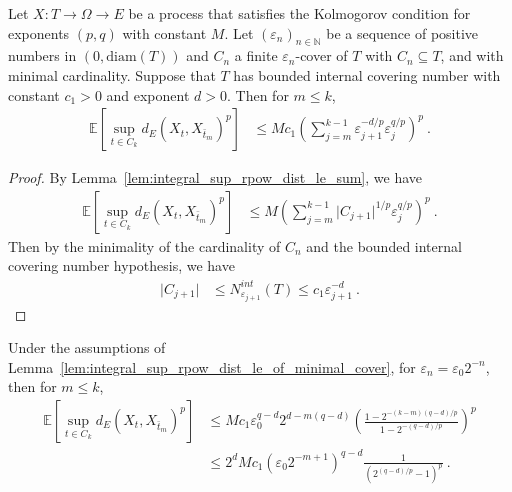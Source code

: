 \begin{lemma}\label{lem:integral_sup_rpow_dist_le_of_minimal_cover}
  \leanok
Let $X : T \to \Omega \to E$ be a process that satisfies the Kolmogorov condition for exponents $(p,q)$ with constant $M$.
Let $(\varepsilon_n)_{n \in \mathbb{N}}$ be a sequence of positive numbers in $(0, \mathrm{diam}(T))$ and $C_n$ a finite $\varepsilon_n$-cover of $T$ with $C_n \subseteq T$, and with minimal cardinality.
Suppose that $T$ has bounded internal covering number with constant $c_1>0$ and exponent $d > 0$.
Then for $m \le k$,
\begin{align*}
  \mathbb{E} \left[\sup_{t \in C_k} d_E(X_t, X_{\bar{t}_m})^p \right]
  &\le M c_1 \left( \sum_{j=m}^{k-1} \varepsilon_{j+1}^{-d/p} \varepsilon_j^{q/p} \right)^p
  \: .
\end{align*}
\end{lemma}

\begin{proof}
By Lemma~\ref{lem:integral_sup_rpow_dist_le_sum}, we have
\begin{align*}
  \mathbb{E} \left[\sup_{t \in C_k} d_E(X_t, X_{\bar{t}_m})^p \right]
  &\le M \left( \sum_{j=m}^{k-1} \vert C_{j+1} \vert^{1/p} \varepsilon_j^{q/p} \right)^p
  \: .
\end{align*}
Then by the minimality of the cardinality of $C_n$ and the bounded internal covering number hypothesis, we have
\begin{align*}
  \vert C_{j+1} \vert
  &\le N^{int}_{\varepsilon_{j+1}}(T)
  \le c_1 \varepsilon_{j+1}^{-d}
  \: .
\end{align*}
\end{proof}


\begin{corollary}\label{cor:integral_sup_rpow_dist_le_of_minimal_cover_two}
  \leanok
Under the assumptions of Lemma~\ref{lem:integral_sup_rpow_dist_le_of_minimal_cover}, for $\varepsilon_n = \varepsilon_0 2^{-n}$, then for $m \le k$,
\begin{align*}
  \mathbb{E} \left[\sup_{t \in C_k} d_E(X_t, X_{\bar{t}_m})^p \right]
  &\le M c_1 \varepsilon_0^{q - d} 2^{d - m(q-d)}\left( \frac{1 - 2^{- (k - m) (q -d)/p}}{1 - 2^{- (q -d)/p}}\right)^p
  \\
  &\le 2^d M c_1 (\varepsilon_0 2^{-m + 1})^{q - d} \frac{1}{\left( 2^{(q -d)/p} - 1\right)^p}
  \: .
\end{align*}
\end{corollary}

